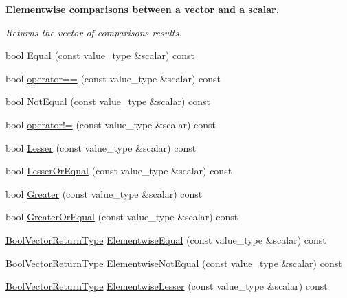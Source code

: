 \begin{Indent}{\bf Elementwise comparisons between a vector and a scalar.}\par
{\em Returns the vector of comparison\textquotesingle{}s results. }\begin{DoxyCompactItemize}
\item 
bool \hyperlink{classvct_dynamic_const_vector_base_ac8b0f957120f2f1cc9c7b524131b8bd1}{Equal} (const value\+\_\+type \&scalar) const 
\item 
bool \hyperlink{classvct_dynamic_const_vector_base_a5241f9f0ad4ee0158d7b8b33f643beb6}{operator==} (const value\+\_\+type \&scalar) const 
\item 
bool \hyperlink{classvct_dynamic_const_vector_base_a87242599727de04e86e0cab3b7f99f68}{Not\+Equal} (const value\+\_\+type \&scalar) const 
\item 
bool \hyperlink{classvct_dynamic_const_vector_base_a32cf8400517b9b1376b60c8313873608}{operator!=} (const value\+\_\+type \&scalar) const 
\item 
bool \hyperlink{classvct_dynamic_const_vector_base_a0dc70a75143298d523e407481b7e22cc}{Lesser} (const value\+\_\+type \&scalar) const 
\item 
bool \hyperlink{classvct_dynamic_const_vector_base_a1c4d6046f27b7bfbf53e8d1825be5814}{Lesser\+Or\+Equal} (const value\+\_\+type \&scalar) const 
\item 
bool \hyperlink{classvct_dynamic_const_vector_base_acad20818e109f3c102803b7fa2b77349}{Greater} (const value\+\_\+type \&scalar) const 
\item 
bool \hyperlink{classvct_dynamic_const_vector_base_a4f03432ee3713b320ca738b292ed64f3}{Greater\+Or\+Equal} (const value\+\_\+type \&scalar) const 
\item 
\hyperlink{classvct_dynamic_const_vector_base_a2de5b9c0f8c70782c548808d3ae4a453}{Bool\+Vector\+Return\+Type} \hyperlink{classvct_dynamic_const_vector_base_aad58b5892f6b58aaaa2b6d245ca246eb}{Elementwise\+Equal} (const value\+\_\+type \&scalar) const 
\item 
\hyperlink{classvct_dynamic_const_vector_base_a2de5b9c0f8c70782c548808d3ae4a453}{Bool\+Vector\+Return\+Type} \hyperlink{classvct_dynamic_const_vector_base_a635d7c0124f86065ec6f446b11a46d02}{Elementwise\+Not\+Equal} (const value\+\_\+type \&scalar) const 
\item 
\hyperlink{classvct_dynamic_const_vector_base_a2de5b9c0f8c70782c548808d3ae4a453}{Bool\+Vector\+Return\+Type} \hyperlink{classvct_dynamic_const_vector_base_a9dd0f9765e8dff24d297a45b086ed915}{Elementwise\+Lesser} (const value\+\_\+type \&scalar) const 

\end{DoxyCompactItemize}
\end{Indent}
